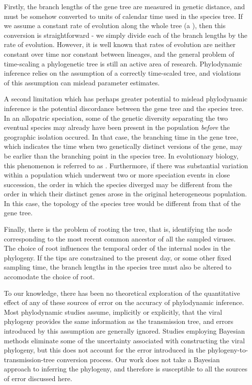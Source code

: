 Firstly, the branch lengths of the gene tree are measured in genetic distance,
and must be somehow converted to units of calendar time used in the species
tree. If we assume a constant rate of evolution along the whole tree (a
), then this conversion is straightforward - we
simply divide each of the branch lengths by the rate of evolution. However, it
is well known that rates of evolution are neither constant over time nor
constant between lineages, and the general problem of time-scaling a
phylogenetic tree is still an active area of research. Phylodynamic inference
relies on the assumption of a correctly time-scaled tree, and violations of
this assumption can mislead parameter estimates.

A second limitation which has perhaps greater potential to mislead phylodynamic
inference is the potential discordance between the gene tree and the species
tree. In an allopatric speciation, some of the genetic diversity separating the
two eventual species may already have been present in the population
\emph{before} the geographic isolation occured. In that case, the branching
time in the gene tree, which indicates the time when two genetically distinct
versions of the gene, may be earlier than the branching point in the species
tree. In evolutionary biology, this phenomenon is referred to as
. Furthermore, if there was substantial
variation within a population which underwent two or more speciation events in
close succession, the order in which the species diverged may be different from
the order in which their distinct genes arose in the original heterogeneous
population. In this case, the topology of the species tree would be different
from that of the gene tree. 

Finally, there is the problem of rooting the tree, that is, identifying the
node corresponding to the most recent common ancestor of all the sampled
viruses. The choice of root influences the temporal order of the internal
nodes in the phylogeny. If the tips are constrained to the present day, or some
other fixed sampling time, the branch lengths in the species tree must also be
altered to accomodate the choice of root. 

To our knowledge, there has been no theoretical exploration of the quantitative
effect of any of these sources of error on the accuracy of phylodynamic
inference. Most phylodynamic studies assume, implicitly or explicitly, that the
viral phylogeny provides the same information as the transmission tree, and
errors introduced by this assumption are generally ignored. Studies employing
Bayesian methods eliminate some of the uncertainty associated with constructing
the viral phylogeny, but this does not account for the error introduced in the
phylogeny-to-transmission-tree conversion process. Our work does not take a
Bayesian approach to inferring the phylogeny, and therefore is susceptible to
all the sources of error discussed here.

